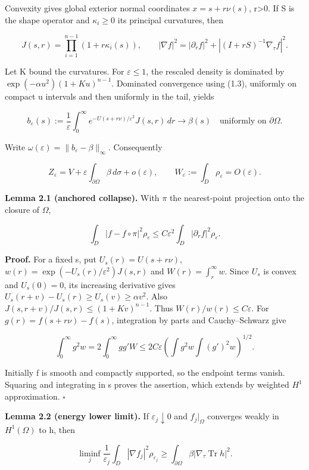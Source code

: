 \documentclass[11pt]{article}
\begin{document}
Convexity gives global exterior normal coordinates \(x=s+r\nu (s)\),
r\textgreater0. If S is the shape operator and \(\kappa _i\geq 0\) its
principal curvatures, then

\[J(s,r)=\prod_{i=1}^{n-1}(1+r\kappa_i(s)),\qquad
|\nabla f|^2=|\partial_r f|^2+
|(I+rS)^{-1}\nabla_\tau f|^2.\tag{2.1}\]

Let K bound the curvatures. For \(\varepsilon \leq 1\), the rescaled
density is dominated by \(\exp (-\alpha u^{2})(1+Ku)^{n-1}\). Dominated
convergence using (1.3), uniformly on compact u intervals and then
uniformly in the tail, yields

\[b_\varepsilon(s):=\frac1\varepsilon\int_0^\infty
e^{-U(s+r\nu)/\varepsilon^2}J(s,r)\,dr\longrightarrow\beta(s)
\quad\text{uniformly on }\partial\Omega.\tag{2.2}\]

Write \(\omega(\varepsilon)=\|b_\varepsilon-\beta\|_\infty\).
Consequently

\[Z_\varepsilon=V+\varepsilon\int_{\partial\Omega}\beta\,d\sigma+o(\varepsilon),
\qquad W_\varepsilon:=\int_D\rho_\varepsilon=O(\varepsilon).\tag{2.3}\]

\textbf{Lemma 2.1 (anchored collapse).} With \(\pi\) the nearest-point
projection onto the closure of \(\Omega\),

\[\int_D|f-f\circ\pi|^2\rho_\varepsilon
\leq C\varepsilon^2\int_D|\partial_r f|^2\rho_\varepsilon.\tag{2.4}\]

\textbf{Proof.} For a fixed s, put \(U_s(r)=U(s+r\nu )\),
\(w(r)=\exp (-U_s(r)/\varepsilon ^{2})J(s,r)\) and
\(W(r)=\int _r^\infty w\). Since \(U_s\) is convex and \(U_s(0)=0\), its
increasing derivative gives
\(U_s(r+v)-U_s(r)\geq U_s(v)\geq \alpha v^{2}\). Also
\(J(s,r+v)/J(s,r)\leq (1+Kv)^{n-1}\). Thus
\(W(r)/w(r)\leq C\varepsilon\). For \(g(r)=f(s+r\nu )-f(s)\),
integration by parts and Cauchy--Schwarz give

\[\int_0^\infty g^2w=2\int_0^\infty gg'W
\leq2C\varepsilon\left(\int g^2w\int(g')^2w\right)^{1/2}.\tag{2.5}\]

Initially f is smooth and compactly supported, so the endpoint terms
vanish. Squaring and integrating in s proves the assertion, which
extends by weighted \(H^{1}\) approximation. \(\square\)

\textbf{Lemma 2.2 (energy lower limit).} If
\(\varepsilon _j\downarrow 0\) and \(f_j|_\Omega\) converges weakly in
\(H^{1}(\Omega )\) to h, then

\[\liminf_j\frac1{\varepsilon_j}\int_D|\nabla f_j|^2\rho_{\varepsilon_j}
\geq\int_{\partial\Omega}\beta|\nabla_\tau\operatorname{Tr}h|^2.\tag{2.6}\]
\end{document}
